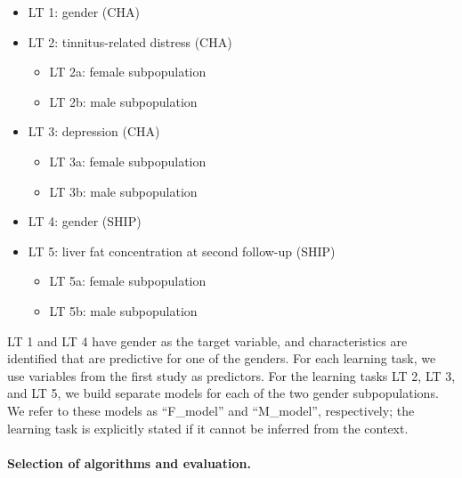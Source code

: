 \documentclass[
  oneside]{book}
\providecommand{\tightlist}{%
  \setlength{\itemsep}{0pt}\setlength{\parskip}{0pt}}
\begin{document}
\begin{itemize}
\tightlist
\item
  LT 1: gender (CHA)
\item
  LT 2: tinnitus-related distress (CHA)

  \begin{itemize}
  \tightlist
  \item
    LT 2a: female subpopulation
  \item
    LT 2b: male subpopulation
  \end{itemize}
\item
  LT 3: depression (CHA)

  \begin{itemize}
  \tightlist
  \item
    LT 3a: female subpopulation
  \item
    LT 3b: male subpopulation
  \end{itemize}
\item
  LT 4: gender (SHIP)
\item
  LT 5: liver fat concentration at second follow-up (SHIP)

  \begin{itemize}
  \tightlist
  \item
    LT 5a: female subpopulation
  \item
    LT 5b: male subpopulation
  \end{itemize}
\end{itemize}

LT 1 and LT 4 have gender as the target variable, and characteristics are identified that are predictive for one of the genders.
For each learning task, we use variables from the first study as predictors.
For the learning tasks LT 2, LT 3, and LT 5, we build separate models for each of the two gender subpopulations.
We refer to these models as ``F\_model'' and ``M\_model'', respectively; the learning task is explicitly stated if it cannot be inferred from the context.

\paragraph*{Selection of algorithms and evaluation.}
\end{document}
